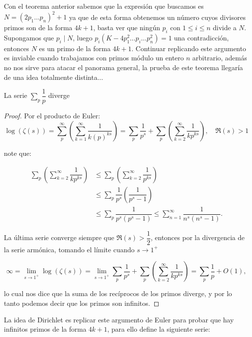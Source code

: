 Con el teorema anterior sabemos que la expresión que buscamos es $N=(2p_1\ldots p_n)^2+1$ ya que de esta forma obtenemos un número cuyos divisores primos son de la forma $4k+1$, basta ver que ningún $p_i$ con $1\leq i\leq n$ divide a $N$.\\

Supongamos que $p_i\mid N$, luego $p_i(K-4p_1^2\ldots p_i\ldots p_n^2)=1$ una contradicción, entonces $N$ es un primo de la forma $4k+1$. Continuar replicando este argumento es inviable cuando trabajamos con primos módulo un entero $n$ arbitrario, además no nos sirve para atacar el panorama general, la prueba de este teorema llegaría de una idea totalmente distinta...


\begin{theorem}[Euler]
La serie $\displaystyle\sum_p \dfrac{1}{p}$ diverge
\end{theorem}

\begin{proof}
Por el producto de Euler:
    $$
\log (\zeta(s))=\sum_p^{\infty}\left(\displaystyle\sum_{k=1}^{\infty} \dfrac{1}{k(p)^{k s}}\right)=\sum_p
\dfrac{1}{p^s}+\sum_{p}\left(\sum_{k=2}^{\infty}\dfrac{1}{kp^{ks}}\right), \quad \Re(s)>1$$

note que:

\begin{align*}
    \sum_{p}\left(\sum_{k=2}^{\infty}\dfrac{1}{kp^{ks}}\right)&\leq \sum_{p}\left(\sum_{k=2}^{\infty}\dfrac{1}{p^{ks}}\right)\\
    &\leq\sum_{p}\dfrac{1}{p^s}\left(\dfrac{1}{p^s-1}\right)\\
    &\leq \sum_{p}\dfrac{1}{p^s(p^s-1)}\leq \sum_{n=1}^{\infty}\dfrac{1}{n^s(n^s-1)}.
\end{align*}

La última serie converge siempre que $\Re(s)>\dfrac{1}{2}$, entonces por la divergencia de la serie armónica, tomando el límite cuando $s\to 1^+$

$$
\infty=\lim_{s\to 1^+}\log(\zeta(s))=\lim_{s\to 1^+}\sum_p
\dfrac{1}{p^s}+\sum_{p}\left(\sum_{k=2}^{\infty}\dfrac{1}{kp^{ks}}\right)=\sum_p
\dfrac{1}{p}+ O(1),$$

lo cual nos dice que la suma de los recíprocos de los primos diverge, y por lo tanto podemos decir que los primos son infinitos. 
\end{proof}

La idea de Dirichlet es replicar este argumento de Euler para probar que hay infinitos primos de la forma $4k+1$, para ello define la siguiente serie:

